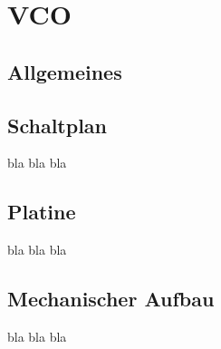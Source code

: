 \chapter{VCO}
\label{ch:VCO}
\section{Allgemeines}


\section{Schaltplan}
bla bla bla

\section{Platine}
bla bla bla

\section{Mechanischer Aufbau}
bla bla bla